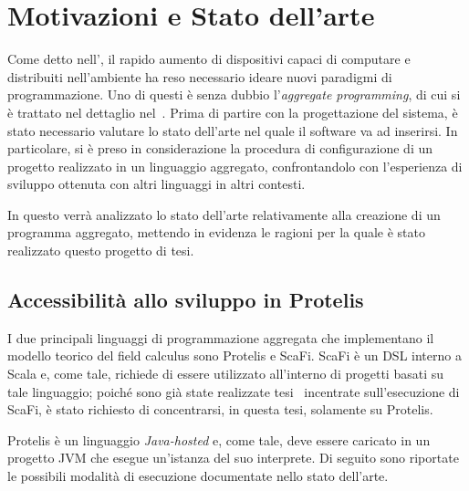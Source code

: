 \chapter{Motivazioni e Stato dell'arte}\label{ch:motivations}

  Come detto nell', il rapido aumento di dispositivi capaci di computare e distribuiti nell'ambiente ha reso necessario ideare nuovi paradigmi di programmazione.
  Uno di questi è senza dubbio l'\emph{aggregate programming}, di cui si è trattato nel dettaglio nel~.
  Prima di partire con la progettazione del sistema, è stato necessario valutare lo stato dell'arte nel quale il software va ad inserirsi.
  In particolare, si è preso in considerazione la procedura di configurazione di un progetto realizzato in un linguaggio aggregato,
  confrontandolo con l'esperienza di sviluppo ottenuta con altri linguaggi in altri contesti.

  In questo  verrà analizzato lo stato dell'arte relativamente alla creazione di un programma aggregato,
  mettendo in evidenza le ragioni per la quale è stato realizzato questo progetto di tesi.

  \section{Accessibilità allo sviluppo in Protelis}\label{subsec:setup}

  I due principali linguaggi di programmazione aggregata che implementano il modello teorico del field calculus sono Protelis e ScaFi.
  ScaFi è un DSL interno a Scala e, come tale, richiede di essere utilizzato all'interno di progetti basati su tale linguaggio;
  poiché sono già state realizzate tesi~\cite{amslaurea12188,amslaurea16824} incentrate sull'esecuzione di ScaFi,
  è stato richiesto di concentrarsi, in questa tesi, solamente su Protelis.

  Protelis è un linguaggio \emph{Java-hosted} e, come tale, deve essere caricato in un progetto JVM che esegue un'istanza del suo interprete.
  Di seguito sono riportate le possibili modalità di esecuzione documentate nello stato dell'arte.

